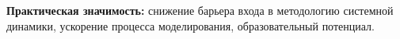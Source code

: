 \textbf{Практическая значимость:} снижение барьера входа в методологию системной динамики, ускорение процесса моделирования, образовательный потенциал.

\vspace{1cm}

\newpage
\tableofcontents

\newpage


\newpage


\newpage


\newpage


\newpage


\newpage


\newpage


\label{LastPage}


